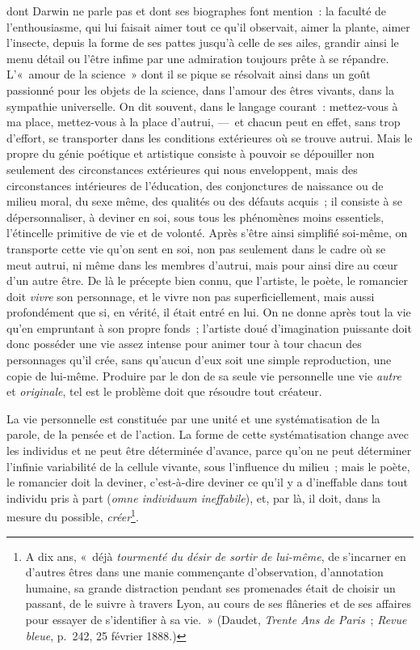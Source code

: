 \documentclass[french,twoside]{book} %
\begin{document}
dont Darwin ne parle pas et dont ses biographes font mention : la faculté de l’enthousiasme, qui lui faisait aimer tout ce qu’il observait, aimer la plante, aimer l’insecte, depuis la forme de ses pattes jusqu’à celle de ses ailes, grandir ainsi le menu détail ou l’être infime par une admiration toujours prête à se répandre. L’« amour de la science » dont il se pique se résolvait ainsi dans un goût passionné pour les objets de la science, dans l’amour des êtres vivants, dans la sympathie universelle. On dit souvent, dans le langage courant : mettez-vous à ma place, mettez-vous à la place d’autrui, — et chacun peut en effet, sans trop d’effort, se transporter dans les conditions extérieures où se trouve autrui. Mais le propre du génie poétique et artistique consiste à pouvoir se dépouiller non seulement des circonstances extérieures qui nous enveloppent, mais des circonstances intérieures de l’éducation, des conjonctures de naissance ou de milieu moral, du sexe même, des qualités ou des défauts acquis ; il consiste à se dépersonnaliser, à deviner en soi, sous tous les phénomènes moins essentiels, l’étincelle primitive de vie et de volonté. Après s’être ainsi simplifié soi-même, on transporte cette vie qu’on sent en soi, non pas seulement dans le cadre où se meut autrui, ni même dans les membres d’autrui, mais pour ainsi dire au cœur d’un autre être. De là le précepte bien connu, que l’artiste, le poète, le romancier doit \emph{vivre} son personnage, et le vivre non pas superficiellement, mais aussi profondément que si, en vérité, il était entré en lui. On ne donne après tout la vie qu’en empruntant à son propre fonds ; l’artiste doué d’imagination puissante doit donc posséder une vie assez intense pour animer tour à tour chacun des personnages qu’il crée, sans qu’aucun d’eux soit une simple reproduction, une copie de lui-même. Produire par le don de sa seule vie personnelle une vie \emph{autre} et \emph{originale}, tel est le problème doit que résoudre tout créateur.\par
La vie personnelle est constituée par une unité et une systématisation de la parole, de la pensée et de l’action. La forme de cette systématisation change avec les individus et ne peut être déterminée d’avance, parce qu’on ne peut déterminer l’infinie variabilité de la cellule vivante, sous l’influence du milieu ; mais le poète, le romancier doit la deviner, c’est-à-dire deviner ce qu’il y a d’ineffable dans tout individu pris à part (\emph{omne individuum ineffabile}), et, par là, il doit, dans la mesure du possible, \emph{créer}\footnote{ A dix ans, « déjà \emph{tourmenté du désir de sortir de lui-même}, de s’incarner en d’autres êtres dans une manie commençante d’observation, d’annotation humaine, sa grande distraction pendant ses promenades était de choisir un passant, de le suivre à travers Lyon, au cours de ses flâneries et de ses affaires pour essayer de s’identifier à sa vie. » (Daudet, \emph{Trente Ans de Paris} ; \emph{Revue bleue}, p. 242, 25 février 1888.)}.\par
\end{document}
